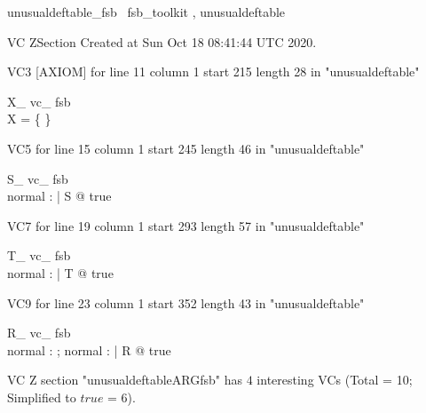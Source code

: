\documentclass{article}
\begin{document}

\begin{zsection}	 \SECTION unusualdeftable\_fsb \parents~fsb\_toolkit , unusualdeftable
\end{zsection}

VC ZSection Created at Sun Oct 18 08:41:44 UTC 2020.

VC3 [AXIOM] for line 11 column 1 start 215 length 28 in "unusualdeftable"
\begin{theorem}{ X\_ vc\_ fsb}\\
 \lnot X = \{ \} \\

\end{theorem}

VC5 for line 15 column 1 start 245 length 46 in "unusualdeftable"
\begin{theorem}{ S\_ vc\_ fsb}\\
 \exists normal : \nat | S @ true \\

\end{theorem}

VC7 for line 19 column 1 start 293 length 57 in "unusualdeftable"
\begin{theorem}{ T\_ vc\_ fsb}\\
 \exists normal : \nat | T @ true \\

\end{theorem}

VC9 for line 23 column 1 start 352 length 43 in "unusualdeftable"
\begin{theorem}{ R\_ vc\_ fsb}\\
 \exists normal : \nat ; normal : \nat | R @ true \\

\end{theorem}



 VC Z section "unusualdeftableARGfsb" has $4$ interesting VCs (Total = 10; Simplified to $true$ = 6).



\end{document}
